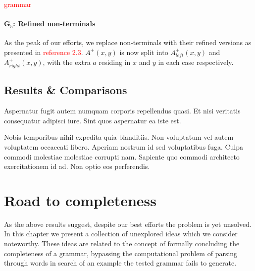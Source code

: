 \documentclass[nonatbib,numbers,10pt]{sigplanconf}
\newcommand\todo[1]{\textcolor{red}{#1}}
\begin{document}
\todo{grammar}

\paragraph{G$_5$: Refined non-terminals}
As the peak of our efforts, we replace non-terminals with their refined versions as presented in \todo{reference 2.3}. $A^{+}(x,y)$ is now split into $A^{+}_{left}(x,y)$ and $A^{+}_{right}(x,y)$, with the extra $a$ residing in $x$ and $y$ in each case respectively.
\subsection{Results \& Comparisons}
Aspernatur fugit autem numquam corporis repellendus quasi. Et nisi veritatis consequatur adipisci iure. Sint quos aspernatur ea iste est.

Nobis temporibus nihil expedita quia blanditiis. Non voluptatum vel autem voluptatem occaecati libero. Aperiam nostrum id sed voluptatibus fuga. Culpa commodi molestiae molestiae corrupti nam. Sapiente quo commodi architecto exercitationem id ad. Non optio eos perferendis.

\begin{center}
\end{center}

\section{Road to completeness}
As the above results suggest, despite our best efforts the problem is yet unsolved. In this chapter we present a collection of unexplored ideas which we consider noteworthy. These ideas are related to the concept of formally concluding the completeness of a grammar, bypassing the computational problem of parsing through words in search of an example the tested grammar fails to generate.
\end{document}
